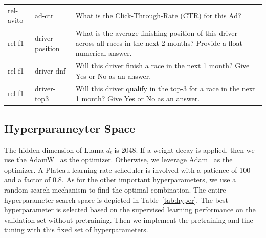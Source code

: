 \documentclass[11pt]{article}
\begin{document}
\begin{longtable}{@{}p{2cm}p{2cm}p{11cm}@{}}
    rel-avito & ad-ctr & What is the Click-Through-Rate (CTR) for this Ad? \\
    rel-f1 & driver-position & What is the average finishing position of this driver across all races in the next 2 months? Provide a float numerical answer. \\
    rel-f1 & driver-dnf & Will this driver finish a race in the next 1 month? Give Yes or No as an answer. \\
    rel-f1 & driver-top3 & Will this driver qualify in the top-3 for a race in the next 1 month? Give Yes or No as an answer. \\
\end{longtable}
\normalsize 

\subsection{Hyperparameyter Space}
The hidden dimension of Llama $d_l$ is 2048. If a weight decay is applied, then we use the AdamW~\citep{loshchilov2017decoupled} as the optimizer. Otherwise, we leverage Adam~\citep{kingma2014adam} as the optimizer. A Plateau learning rate scheduler is involved with a patience of 100 and a factor of 0.8. 
As for the other important hyperparameters, we use a random search mechanism to find the optimal combination. The entire hyperparameter search space is depicted in Table~\ref{tab:hyper}. The best hyperparameter is selected based on the supervised learning performance on the validation set without pretraining. Then we implement the pretraining and fine-tuning with this fixed set of hyperparameters.
\end{document}
